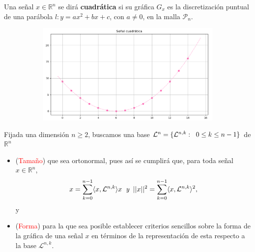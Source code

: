 \documentclass[]{beamer}
\theoremstyle{definition}
\newcommand{\IR}{\mathbb{R}}
\newcommand{\suma}[3]{\sum\limits_{#1}^{#2}#3} %
\newcommand{\cali}[1]{\mathcal{#1}} %
\begin{document}
\begin{frame}
Una señal $x \in \IR^{n}$ se dirá \textbf{cuadrática} si su gráfica
$G_{x}$ es la discretización puntual de una parábola
$l : y = ax^{2} + bx + c$, con $a \neq 0$, en la malla
$\cali{P}_{n}$.

\begin{figure}[H]
\centering
	\begin{figure}
		\includegraphics[scale=0.4]{cuadraticas}
 	\end{figure}
 \end{figure}

\end{frame}





\begin{frame}
Fijada una dimensión $n \geq 2$, buscamos una base
$\cali{L}^{n} = \{ \cali{L}^{n,k}: \hspace{0.2cm} 0 \leq k \leq n-1 \}$
de $\IR^{n}$

\begin{itemize}
	\item (\textcolor{red}{Tamaño}) 
	que sea ortonormal, pues así se cumplirá que,
	para toda señal $x \in \IR^{n}$, 
	\[
	x = \suma{k=0}{n-1}{\langle x, \cali{L}^{n,k} \rangle x}
	\hspace{0.2cm} \textit{y} \hspace{0.2cm}
	||x||^{2} = \suma{k=0}{n-1}{\langle x, \cali{L}^{n,k} \rangle^{2}},
	\]
	y
	
	\item (\textcolor{red}{Forma}) para la que sea posible establecer criterios
	sencillos sobre la forma de la gráfica de una señal $x$ en términos
	de la representación de esta respecto a la base $\cali{L}^{n,k}$.
	
\end{itemize}
\end{frame}
\end{document}
